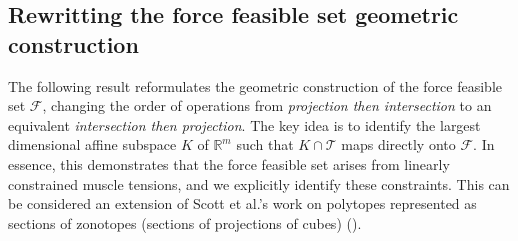 \subsection{Rewritting the force feasible set geometric construction}
\label{subsec:rewriting_force_feasible_set}
The following result reformulates the geometric construction of the force feasible set $\mathcal{F}$, changing the order of operations from \emph{projection then intersection} to an equivalent \emph{intersection then projection}. The key idea is to identify the largest dimensional affine subspace $K$ of $\mathbb{R}^m$ such that $K \cap \mathcal{T}$ maps directly onto $\mathcal{F}$. In essence, this demonstrates that the force feasible set arises from linearly constrained muscle tensions, and we explicitly identify these constraints. This can be considered an extension of Scott et al.'s work on polytopes represented as sections of zonotopes (sections of projections of cubes) (\cite{scottConstrainedZonotopesNew2016}).

